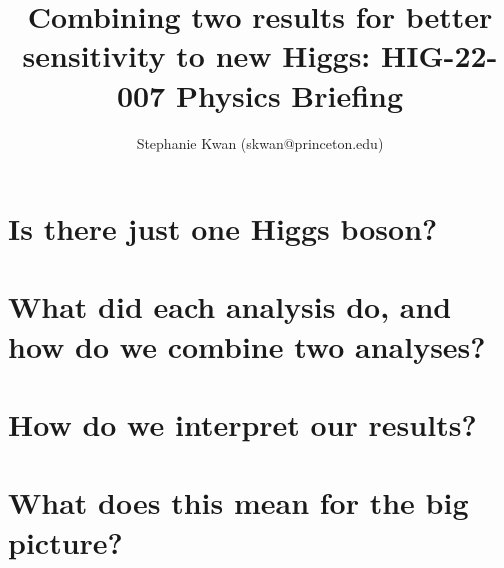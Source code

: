 \documentclass{article}
\title{Combining two results for better sensitivity to new Higgs: HIG-22-007 Physics Briefing}
\author{Stephanie Kwan (skwan@princeton.edu)}
\begin{document}
\maketitle


\section{Is there just one Higgs boson?}


\section{What did each analysis do, and how do we combine two analyses?}


\section{How do we interpret our results?}


\section{What does this mean for the big picture?}
\end{document}

